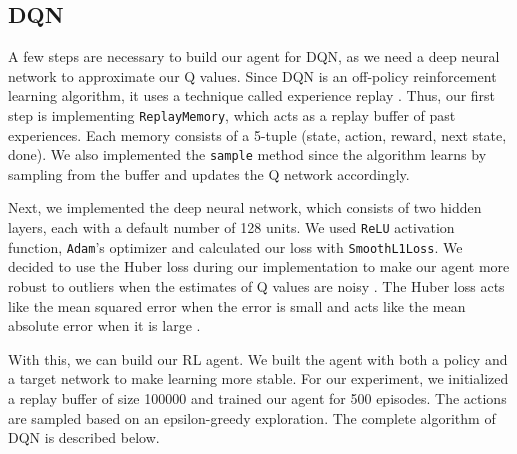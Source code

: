 \documentclass{article}
\begin{document}
\subsection{DQN}
A few steps are necessary to build our agent for DQN, as we need a deep neural
network to approximate our Q values. Since DQN is an off-policy reinforcement
learning algorithm, it uses a technique called experience replay
\cite{learning_control, replay}. Thus, our first step is implementing
\verb+ReplayMemory+, which acts as a replay buffer of past experiences. Each
memory consists of a 5-tuple (state, action, reward, next state, done). We also
implemented the \verb+sample+ method since the algorithm learns by sampling
from the buffer and updates the Q network accordingly.

Next, we implemented the deep neural network, which consists of two hidden
layers, each with a default number of 128 units. We used \verb+ReLU+ activation
function, \verb+Adam+'s optimizer and calculated our loss with
\verb+SmoothL1Loss+. We decided to use the Huber loss during our implementation
to make our agent more robust to outliers when the estimates of Q values are
noisy \cite{noise}. The Huber loss acts like the mean squared error when the
error is small and acts like the mean absolute error when it is large
\cite{hubert}.

With this, we can build our RL agent. We built the agent with both a policy and
a target network to make learning more stable. For our experiment, we
initialized a replay buffer of size 100000 and trained our agent for 500
episodes. The actions are sampled based on an epsilon-greedy exploration. The
complete algorithm of DQN is described below.
\end{document}
